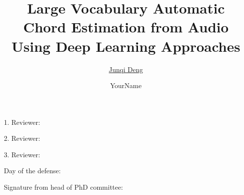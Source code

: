 \documentclass[twoside,12pt]{Latex/Classes/PhDthesisPSnPDF}
\title{Large Vocabulary Automatic Chord Estimation from Audio Using Deep Learning Approaches}
\author{\href{http://www.tangkk.net}{Junqi Deng}}
\author{YourName}
\begin{document}

\setlength{\baselineskip}{24pt}



\maketitle  %



\newpage
\vspace{10mm}
1. Reviewer:

\vspace{10mm}
2. Reviewer: 

\vspace{10mm}
3. Reviewer:

\vspace{20mm}
Day of the defense:

\vspace{20mm}
\hspace{50mm}Signature from head of PhD committee:







%   



\frontmatter




\end{document}
